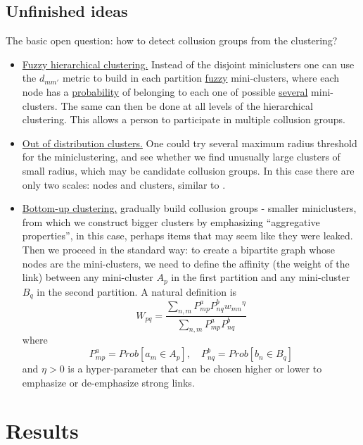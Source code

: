\documentclass{article}
\begin{document}
\subsection{Unfinished ideas}
The basic open question: how to detect collusion groups from the clustering?
\begin{itemize}
	\item \underline{Fuzzy hierarchical clustering.} Instead of the disjoint miniclusters one can use the $d_{mm'}$ metric to build in each partition \underline{fuzzy} mini-clusters, where each node has a \underline{probability} of belonging to each one of possible \underline{several} mini-clusters. The same can then be done at all levels of the hierarchical clustering. This allows a person to participate in multiple collusion groups.
	\item \underline{Out of distribution clusters.} One could try several maximum radius threshold for the miniclustering, and see whether we find unusually large clusters of small radius, which may be candidate collusion groups. In this case there are only two scales: nodes and clusters, similar to \cite{primal}.
  \item \underline{Bottom-up clustering.} gradually build collusion groups - smaller miniclusters, from which we construct bigger clusters by emphasizing ``aggregative properties'', in this case, perhaps items that may seem like they were leaked. Then we proceed in the standard way: to create a bipartite graph whose nodes are the mini-clusters, we need to define  the affinity (the weight of the link) between any mini-cluster $A_p$ in the first partition and any mini-cluster $B_q$ in the second partition. A natural definition is
\begin{equation}
W_{pq} = \frac{\sum_{n,m} P^a_{mp}P^b_{nq}{w_{mn}}^\eta}{ \sum_{n,m}P^a_{mp}P^b_{nq}}
\label{eqn:b2}
\end{equation}
where
\begin{equation}
P^a_{mp} = Prob \left[a_m \in A_p\right], \quad P^b_{nq} = Prob \left[ b_n \in B_q \right]
\end{equation}
and $\eta>0$ is a hyper-parameter that can be chosen higher or lower to emphasize or de-emphasize strong links.
\end{itemize}

\section{Results}
\label{results}
\end{document}
